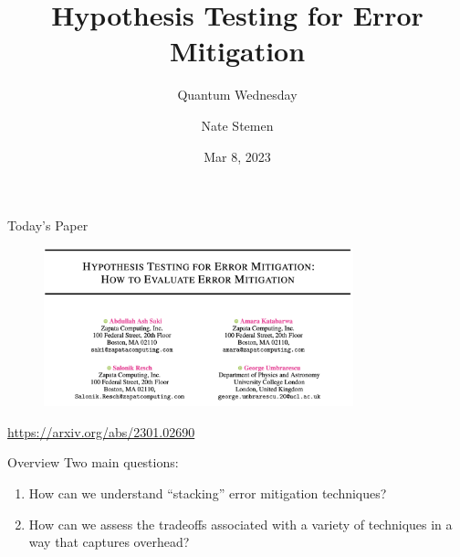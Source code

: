 \documentclass[11pt,aspectratio=1610,xcolor=dvipsnames]{beamer}
\title{Hypothesis Testing for Error Mitigation}
\subtitle{Quantum Wednesday}
\date{Mar 8, 2023}
\author{Nate Stemen}
\begin{document}
\maketitle

\begin{frame}{Today's Paper}
	\begin{figure}[h]
		\centering
		\includegraphics[width=0.8\textwidth]{paper.png}
	\end{figure}
	\begin{center}
		\url{https://arxiv.org/abs/2301.02690}
	\end{center}
\end{frame}

\begin{frame}{Overview}
	Two main questions:
	\begin{enumerate}[<+->]
		\item How can we understand ``stacking'' error mitigation techniques?
		\item How can we assess the tradeoffs associated with a variety of techniques in a way that captures overhead?
	\end{enumerate}
\end{frame}
\end{document}
